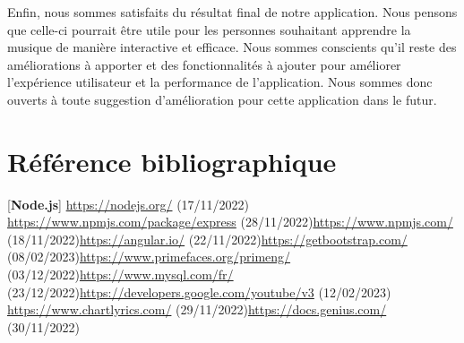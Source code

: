 \documentclass[12pt,french]{article}
\begin{document}
\medskip

Enfin, nous sommes satisfaits du résultat final de notre application. Nous pensons que celle-ci pourrait être utile pour les personnes souhaitant apprendre la musique de manière interactive et efficace. Nous sommes conscients qu'il reste des améliorations à apporter et des fonctionnalités à ajouter pour améliorer l'expérience utilisateur et la performance de l'application. Nous sommes donc ouverts à toute suggestion d'amélioration pour cette application dans le futur.

\newpage
\vspace*{1cm}

\section*{Référence bibliographique}

[\textbf{Node.js}] \href{https://nodejs.org/}{https://nodejs.org/} (17/11/2022) \newline{} \href{https://www.npmjs.com/package/express}{https://www.npmjs.com/package/express} (28/11/2022)\newline{} \href{https://www.npmjs.com/}{https://www.npmjs.com/} (18/11/2022)\newline{} \href{https://angular.io/}{https://angular.io/} (22/11/2022)\newline{} \href{https://getbootstrap.com/}{https://getbootstrap.com/} (08/02/2023)\newline{} \href{https://www.primefaces.org/primeng/}{https://www.primefaces.org/primeng/} (03/12/2022)\newline{} \href{https://www.mysql.com/fr/}{https://www.mysql.com/fr/} (23/12/2022)\newline{} \href{https://developers.google.com/youtube/v3}{https://developers.google.com/youtube/v3} (12/02/2023) \newline{} \href{https://www.chartlyrics.com/}{https://www.chartlyrics.com/} (29/11/2022)\newline{} \href{https://docs.genius.com/}{https://docs.genius.com/} (30/11/2022)\newline\newline



\printglossary[type=main, title=Glossaire]
\end{document}
